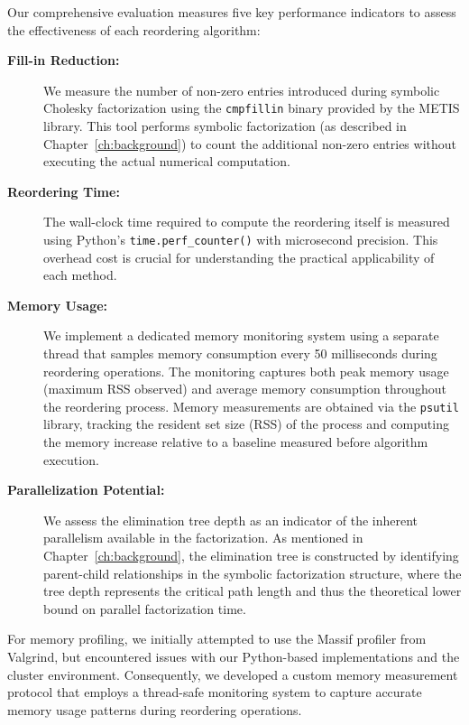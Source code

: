 Our comprehensive evaluation measures five key performance indicators to assess the effectiveness of each reordering algorithm:

\begin{description}
   \item[\textbf{Fill-in Reduction:}] We measure the number of non-zero entries introduced during symbolic Cholesky factorization using the \texttt{cmpfillin} binary provided by the METIS library. This tool performs symbolic factorization (as described in Chapter~\ref{ch:background}) to count the additional non-zero entries without executing the actual numerical computation. 
      
      \item[\textbf{Reordering Time:}] The wall-clock time required to compute the reordering itself is measured using Python's \texttt{time.perf\_counter()} with microsecond precision. This overhead cost is crucial for understanding the practical applicability of each method.
      
      \item[\textbf{Memory Usage:}] We implement a dedicated memory monitoring system using a separate thread that samples memory consumption every 50 milliseconds during reordering operations. The monitoring captures both peak memory usage (maximum RSS observed) and average memory consumption throughout the reordering process. Memory measurements are obtained via the \texttt{psutil} library, tracking the resident set size (RSS) of the process and computing the memory increase relative to a baseline measured before algorithm execution.

      \item[\textbf{Parallelization Potential:}] We assess the elimination tree depth as an indicator of the inherent parallelism available in the factorization. As mentioned in Chapter~\ref{ch:background}, the elimination tree is constructed by identifying parent-child relationships in the symbolic factorization structure, where the tree depth represents the critical path length and thus the theoretical lower bound on parallel factorization time.
\end{description}

For memory profiling, we initially attempted to use the Massif profiler from Valgrind, but encountered issues with our Python-based implementations and the cluster environment. Consequently, we developed a custom memory measurement protocol that employs a thread-safe monitoring system to capture accurate memory usage patterns during reordering operations.

